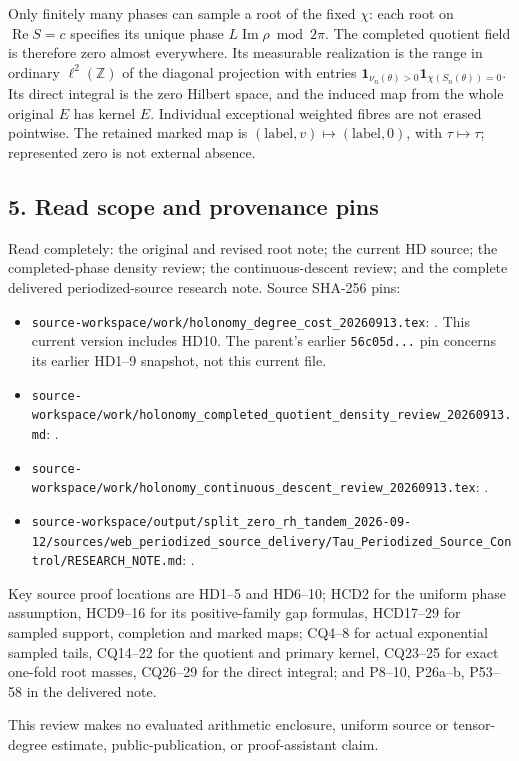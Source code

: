 Only finitely many phases can sample a root of the fixed \(\chi\): each root on \(\operatorname{Re}S=c\) specifies its unique phase \(L\operatorname{Im}\rho\bmod2\pi\). The completed quotient field is therefore zero almost everywhere. Its measurable realization is the range in ordinary \(\ell^2(\mathbb Z)\) of the diagonal projection with entries \(\mathbf1_{\nu_n(\theta)>0}\mathbf1_{\chi(S_n(\theta))=0}\). Its direct integral is the zero Hilbert space, and the induced map from the whole original \(E\) has kernel \(E\). Individual exceptional weighted fibres are not erased pointwise. The retained marked map is \((\mathrm{label},v)\longmapsto(\mathrm{label},0)\), with \(\tau\longmapsto\tau\); represented zero is not external absence.

\subsection{5. Read scope and provenance pins}\label{read-scope-and-provenance-pins}

Read completely: the original and revised root note; the current HD source; the completed-phase density review; the continuous-descent review; and the complete delivered periodized-source research note. Source SHA-256 pins:

\begin{itemize}
\tightlist
\item
  \nolinkurl{source-workspace/work/holonomy_degree_cost_20260913.tex}: \texttt{}. This current version includes HD10. The parent's earlier \texttt{56c05d...} pin concerns its earlier HD1--9 snapshot, not this current file.
\item
  \nolinkurl{source-workspace/work/holonomy_completed_quotient_density_review_20260913.md}: \texttt{}.
\item
  \nolinkurl{source-workspace/work/holonomy_continuous_descent_review_20260913.tex}: \texttt{}.
\item
  \nolinkurl{source-workspace/output/split_zero_rh_tandem_2026-09-12/sources/web_periodized_source_delivery/Tau_Periodized_Source_Control/RESEARCH_NOTE.md}: \texttt{}.
\end{itemize}

Key source proof locations are HD1--5 and HD6--10; HCD2 for the uniform phase assumption, HCD9--16 for its positive-family gap formulas, HCD17--29 for sampled support, completion and marked maps; CQ4--8 for actual exponential sampled tails, CQ14--22 for the quotient and primary kernel, CQ23--25 for exact one-fold root masses, CQ26--29 for the direct integral; and P8--10, P26a--b, P53--58 in the delivered note.

This review makes no evaluated arithmetic enclosure, uniform source or tensor-degree estimate, public-publication, or proof-assistant claim.
